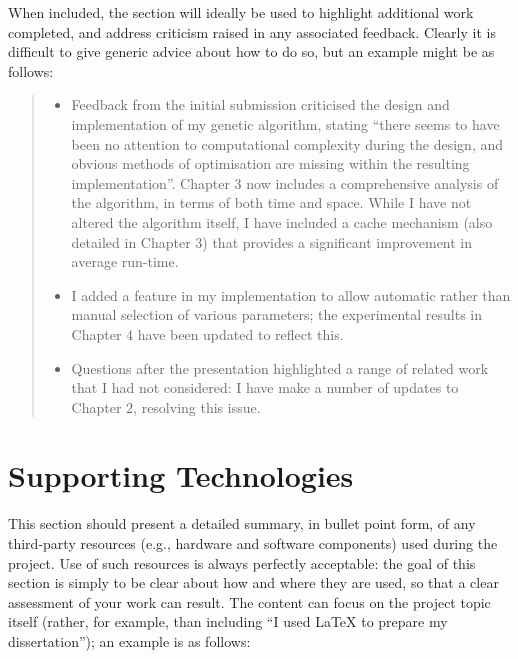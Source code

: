 \documentclass[ oneside,%
                    author={Michael Wray},
                    degree={BSc},
                     title={Some Structural Guidelines for CS Project Dissertations \\ With a Second Line Added to the Title},
                    unit={COMS30045},
                    subtitle={And Even A Fancy Subtitle}]{dissertation}
\begin{document}
When included, the section will ideally be used to highlight additional
work completed, and address criticism raised in any associated feedback.
Clearly it is difficult to give generic advice about how to do so, but
an example might be as follows:

\begin{quote}
\noindent
\begin{itemize}
\item Feedback from the initial submission criticised the design and 
      implementation of my genetic algorithm, stating ``there seems 
      to have been no attention to computational complexity during the
      design, and obvious methods of optimisation are missing within
      the resulting implementation''.  Chapter $3$ now includes a
      comprehensive analysis of the algorithm, in terms of both time
      and space.  While I have not altered the algorithm itself, I
      have included a cache mechanism (also detailed in Chapter $3$)
      that provides a significant improvement in average run-time.
\item I added a feature in my implementation to allow automatic rather
      than manual selection of various parameters; the experimental
      results in Chapter $4$ have been updated to reflect this.
\item Questions after the presentation highlighted a range of related
      work that I had not considered: I have make a number of updates 
      to Chapter $2$, resolving this issue.
\end{itemize}
\end{quote}


\chapter*{Supporting Technologies}


\noindent
This section should present a detailed summary, in bullet point form, 
of any third-party resources (e.g., hardware and software components) 
used during the project.  Use of such resources is always perfectly 
acceptable: the goal of this section is simply to be clear about how
and where they are used, so that a clear assessment of your work can
result.  The content can focus on the project topic itself (rather,
for example, than including ``I used \mbox{\LaTeX} to prepare my 
dissertation''); an example is as follows:
\end{document}
